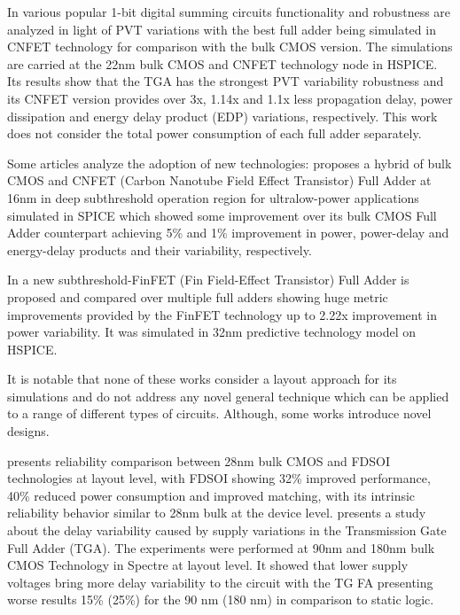 \documentclass[ecp,tc, english]{iiufrgs}
\begin{document}
In \cite{islam2011design} various popular 1-bit digital summing circuits functionality and robustness are analyzed in light of PVT variations with the best full adder being simulated in CNFET technology for comparison with the bulk CMOS version. The simulations are carried at the 22nm bulk CMOS and CNFET technology node in HSPICE. Its results show that the TGA has the strongest PVT variability robustness and its CNFET version provides over 3x, 1.14x and 1.1x less propagation delay, power dissipation and energy delay product (EDP) variations, respectively. This work does not consider the total power consumption of each full adder separately.

Some articles analyze the adoption of new technologies: \cite{guduri2015design} proposes a hybrid of bulk CMOS and CNFET (Carbon Nanotube Field Effect Transistor) Full Adder at 16nm in deep subthreshold operation region for ultralow-power applications simulated in SPICE which showed some improvement over its bulk CMOS Full Adder counterpart achieving 5\% and 1\% improvement in power, power-delay and energy-delay products and their variability, respectively.  

In \cite{islam2011variability} a new subthreshold-FinFET (Fin Field-Effect Transistor) Full Adder is proposed and compared over multiple full adders showing huge metric improvements provided by the FinFET technology up to 2.22x improvement in power variability. It was simulated in 32nm predictive technology model on HSPICE. 

It is notable that none of these works consider a layout approach for its simulations and do not address any novel general technique which can be applied to a range of different types of circuits. Although, some works introduce novel designs.

\cite{federspiel201228nm} presents reliability comparison between 28nm bulk CMOS and FDSOI technologies at layout level, with FDSOI showing 32\% improved performance, 40\% reduced power consumption and improved matching, with its intrinsic reliability behavior similar to 28nm bulk at the device level. \cite{alioto2007delay} presents a study about the delay variability caused by supply variations in the Transmission Gate Full Adder (TGA). The experiments were performed at 90nm and 180nm bulk CMOS Technology in Spectre at layout level. It showed that lower supply voltages bring more delay variability to the circuit with the TG FA presenting worse results 15\% (25\%) for the 90 nm (180 nm) in comparison to static logic.
\end{document}
